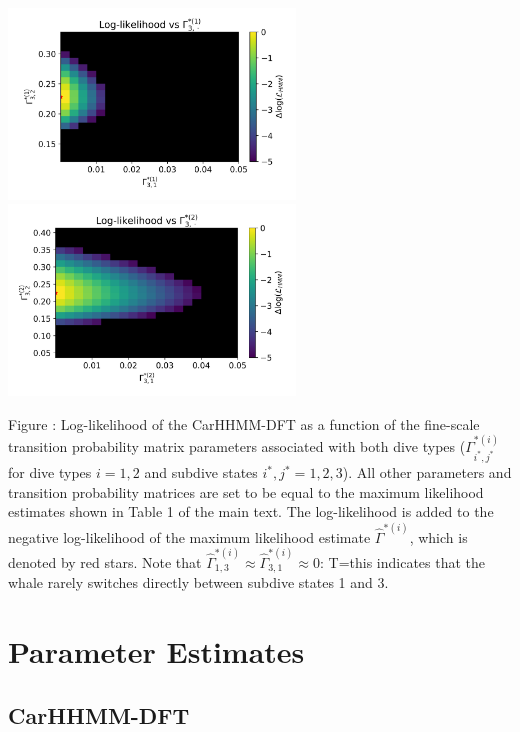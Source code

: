 \documentclass{article}
\begin{document}
\begin{center}
        \includegraphics[width=3in]{../Plots/2019/20190902-182840-CATs_OB_1_0_267_CarHHMM2_fine-gamma-likelihood-0-row_2.png}
        \includegraphics[width=3in]{../Plots/2019/20190902-182840-CATs_OB_1_0_267_CarHHMM2_fine-gamma-likelihood-1-row_2.png}
        \end{center}
        
        \noindent Figure : Log-likelihood of the CarHHMM-DFT as a function of the fine-scale transition probability matrix parameters associated with both dive types ($\Gamma^{*(i)}_{i^*,j^*}$ for dive types $i = 1,2$ and subdive states $i^*,j^* = 1,2,3$). All other parameters and transition probability matrices are set to be equal to the maximum likelihood estimates shown in Table 1 of the main text. The log-likelihood is added to the negative log-likelihood of the maximum likelihood estimate $\hat \Gamma^{*(i)}$, which is denoted by red stars. Note that $\hat \Gamma^{*(i)}_{1,3} \approx \hat \Gamma^{*(i)}_{3,1} \approx 0$: T=this indicates that the whale rarely switches directly between subdive states 1 and 3.
        \addtocounter{fignum}{1}
        
        \newpage    
    
    \section{Parameter Estimates}

        \subsection{CarHHMM-DFT}
        
\end{document}
